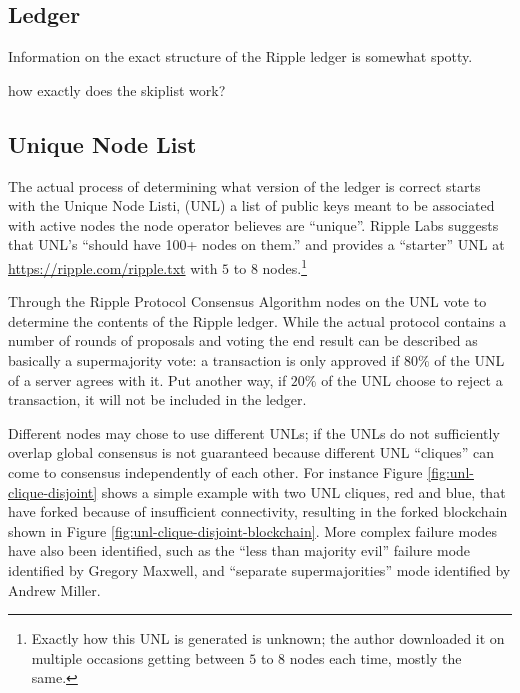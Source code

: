 \documentclass{article}
\begin{document}
\subsection{Ledger}

Information on the exact structure of the Ripple ledger is somewhat spotty.

how exactly does the skiplist work?


\subsection{Unique Node List}

The actual process of determining what version of the ledger is correct starts
with the Unique Node Listi, (UNL) a list of public keys meant to be associated
with active nodes the node operator believes are
``unique''.\cite{ripple-wiki-unl} Ripple Labs suggests that UNL's ``should have
100+ nodes on them.''\cite{ripple-wiki-unl} and provides a ``starter'' UNL at
\url{https://ripple.com/ripple.txt} with $5$ to $8$ nodes.\footnote{Exactly how this UNL is
generated is unknown; the author downloaded it on multiple occasions getting
between $5$ to $8$ nodes each time, mostly the same.}

Through the Ripple Protocol Consensus Algorithm\cite{ripple-consensus-paper}
nodes on the UNL vote to determine the contents of the Ripple ledger. While the
actual protocol contains a number of rounds of proposals and voting the end
result can be described as basically a supermajority vote: a transaction is
only approved if $80\%$ of the UNL of a server agrees with
it.\cite[3.2]{ripple-consensus-paper} Put another way, if $20\%$ of the UNL
choose to reject a transaction, it will not be included in the ledger.

Different nodes may chose to use different UNLs; if the UNLs do not
sufficiently overlap global consensus is not guaranteed because different UNL
``cliques'' can come to consensus independently of each other. For instance
Figure \ref{fig:unl-clique-disjoint} shows a simple example with two UNL
cliques, red and blue, that have forked because of insufficient connectivity,
resulting in the forked blockchain shown in Figure
\ref{fig:unl-clique-disjoint-blockchain}. More complex failure modes have also
been identified, such as the ``less than majority evil'' failure mode
identified by Gregory Maxwell,\cite{gmaxwell-btctalk-ripple} and ``separate
supermajorities'' mode identified by Andrew Miller.\cite{amiller-rippletalk}
\end{document}
